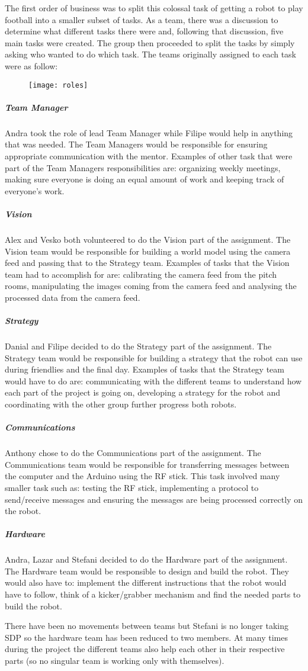 The first order of business was to split this colossal task of getting a robot to play football into a smaller subset of tasks. As a team, there was a discussion to determine what different tasks there were and, following that discussion, five main tasks were created. The group then proceeded to split the tasks by simply asking who wanted to do which task. The teams originally assigned to each task were as follow:

\begin{figure}[H]
    \centering
    \texttt{[image: roles]}
    \label{fig:roles}
\end{figure}

\subparagraph{Team Manager}
Andra took the role of lead Team Manager while Filipe would help in anything that was needed. The Team Managers would be responsible for ensuring appropriate communication with the mentor. Examples of other task that were part of the Team Managers responsibilities are: organizing weekly meetings, making sure everyone is doing an equal amount of work and keeping track of everyone's work.


\subparagraph{Vision}
Alex and Vesko both volunteered to do the Vision part of the assignment. The Vision team would be responsible for building a world model using the camera feed and passing that to the Strategy team. Examples of tasks that the Vision team had to accomplish for are: calibrating the camera feed from the pitch rooms, manipulating the images coming from the camera feed and analysing the processed data from the camera feed.

\subparagraph{Strategy}
Danial and Filipe decided to do the Strategy part of the assignment. The Strategy team would be responsible for building a strategy that the robot can use during friendlies and the final day. Examples of tasks that the Strategy team would have to do are: communicating with the different teams to understand how each part of the project is going on, developing a strategy for the robot and coordinating with the other group further progress both robots.

\subparagraph{Communications}
Anthony chose to do the Communications part of the assignment. The Communications team would be responsible for transferring messages between the computer and the Arduino using the RF stick. This task involved many smaller task such as: testing the RF stick, implementing a protocol to send/receive messages and ensuring the messages are being processed correctly on the robot.

\subparagraph{Hardware}
Andra, Lazar and Stefani decided to do the Hardware part of the assignment. The Hardware team would be responsible to design and build the robot. They would also have to: implement the different instructions that the robot would have to follow, think of a kicker/grabber mechanism and find the needed parts to build the robot.

There have been no movements between teams but Stefani is no longer taking SDP so the hardware team has been reduced to two members. At many times during the project the different teams also help each other in their respective parts (so no singular team is working only with themselves).